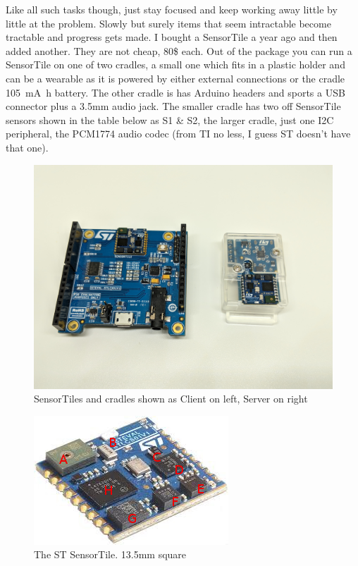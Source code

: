 \documentclass[11pt]{article}
\numberwithin{figure}{section}
\begin{document}
Like all such tasks though, just stay focused and keep working
away little by little at the problem. Slowly but surely items that
seem intractable become tractable and progress gets made. I bought a
SensorTile a year ago and then added another. They are not cheap, 80\$
each. Out of the package you can run a SensorTile on one of two
cradles, a small one which fits in a plastic holder and can be a
wearable as it is powered by either external connections or the cradle
\SI{105}{\milli\ampere\hour} battery. The other cradle is has Arduino
headers and sports a USB connector plus a 3.5mm audio jack. The
smaller cradle has two off SensorTile sensors shown in the table below
as S1 \& S2, the larger cradle, just one I2C peripheral, the PCM1774
audio codec (from TI no less, I guess ST doesn't have that one).
\clearpage
\begin{figure}[!htbp] %
\centering
\includegraphics[scale=0.1]{ST2.jpg}
\caption{SensorTiles and cradles shown as Client on left, Server on right}
\label{Figure:ST2.jpg}
\end{figure}

\clearpage
\begin{figure}[!htb] %
\centering
\includegraphics[scale=1.0]{sensortile2.jpg}
\caption{The ST SensorTile. 13.5mm square}
\label{Figure:SensorTile}
\end{figure}
\end{document}
